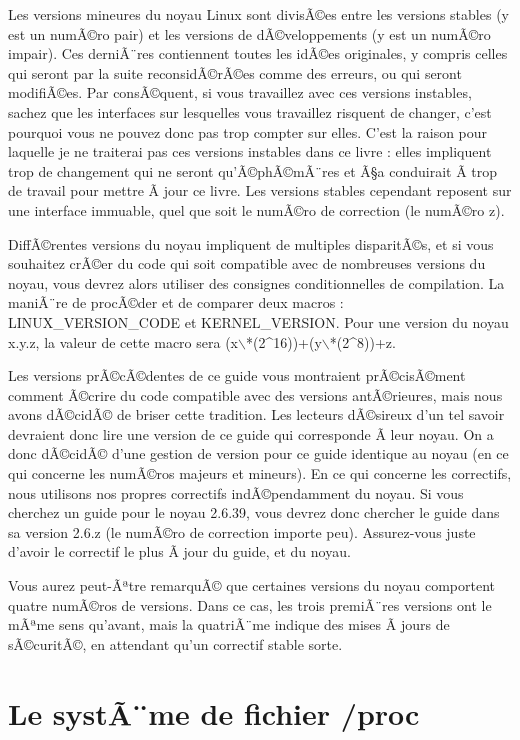 \documentclass[11pt]{article}
\begin{document}
Les versions mineures du noyau Linux sont divisÃ©es entre les versions stables (y est un numÃ©ro pair) et les versions de dÃ©veloppements (y est un numÃ©ro impair). Ces derniÃ¨res contiennent toutes les idÃ©es originales, y compris celles qui seront par la suite reconsidÃ©rÃ©es comme des erreurs, ou qui seront modifiÃ©es. Par consÃ©quent, si vous travaillez avec ces versions instables, sachez que les interfaces sur lesquelles vous travaillez risquent de changer, c'est pourquoi vous ne pouvez donc pas trop compter sur elles. C'est la raison pour laquelle je ne traiterai pas ces versions instables dans ce livre : elles impliquent trop de changement qui ne seront qu'Ã©phÃ©mÃ¨res et Ã§a conduirait Ã  trop de travail pour mettre Ã  jour ce livre. Les versions stables cependant reposent sur une interface immuable, quel que soit le numÃ©ro de correction (le numÃ©ro z).

DiffÃ©rentes versions du noyau impliquent de multiples disparitÃ©s, et si vous souhaitez crÃ©er du code qui soit compatible avec de nombreuses versions du noyau, vous devrez alors utiliser des consignes conditionnelles de compilation. La maniÃ¨re de procÃ©der et de comparer deux macros : LINUX\_VERSION\_CODE et KERNEL\_VERSION. Pour une version du noyau x.y.z, la valeur de cette macro sera (x$\backslash$*(2\^{}16))+(y$\backslash$*(2\^{}8))+z.

Les versions prÃ©cÃ©dentes de ce guide vous montraient prÃ©cisÃ©ment comment Ã©crire du code compatible avec des versions antÃ©rieures, mais nous avons dÃ©cidÃ© de briser cette tradition. Les lecteurs dÃ©sireux d'un tel savoir devraient donc lire une version de ce guide qui corresponde Ã  leur noyau. On a donc dÃ©cidÃ© d'une gestion de version pour ce guide identique au noyau (en ce qui concerne les numÃ©ros majeurs et mineurs). En ce qui concerne les correctifs, nous utilisons nos propres correctifs indÃ©pendamment du noyau. Si vous cherchez un guide pour le noyau 2.6.39, vous devrez donc chercher le guide dans sa version 2.6.z (le numÃ©ro de correction importe peu). Assurez-vous juste d'avoir le correctif le plus Ã  jour du guide, et du noyau.

Vous aurez peut-Ãªtre remarquÃ© que certaines versions du noyau comportent quatre numÃ©ros de versions. Dans ce cas, les trois premiÃ¨res versions ont le mÃªme sens qu'avant, mais la quatriÃ¨me indique des mises Ã  jours de sÃ©curitÃ©, en attendant qu'un correctif stable sorte.

\section*{Le systÃ¨me de fichier /proc}
\label{sec-7}
\end{document}
